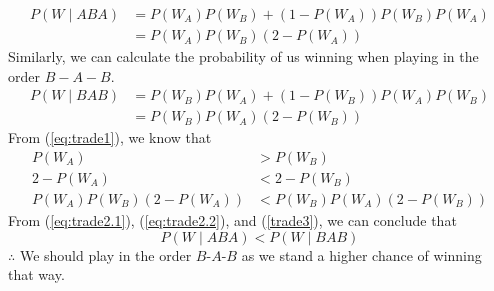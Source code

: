 \begin{align}\label{eq:trade2.1}
	P(W \mid ABA) & = P(W_A)P(W_B) + (1-P(W_A))P(W_B)P(W_A) \nonumber \\
	              & = P(W_A)P(W_B)(2 - P(W_A))
\end{align}
Similarly, we can calculate the probability of us winning when playing in the order $B-A-B$.
\begin{align}\label{eq:trade2.2}
	P(W \mid BAB) & = P(W_B)P(W_A) + (1-P(W_B))P(W_A)P(W_B) \nonumber \\
	              & = P(W_B)P(W_A)(2 - P(W_B))
\end{align}
From (\ref{eq:trade1}), we know that
\begin{align}\label{trade3}
	P(W_A)                   & > P(W_B)     \nonumber     \\
	2 - P(W_A)               & < 2 - P(W_B)\nonumber      \\
	P(W_A)P(W_B)(2 - P(W_A)) & < P(W_B)P(W_A)(2 - P(W_B))
\end{align}
From (\ref{eq:trade2.1}), (\ref{eq:trade2.2}), and (\ref{trade3}), we can conclude that
\[P(W \mid ABA) < P(W \mid BAB)\]
$\therefore$ We should play in the order $B$-$A$-$B$ as we stand a higher chance of winning that way.

